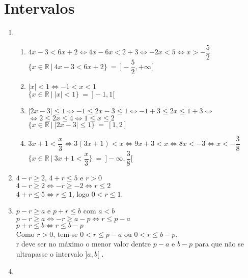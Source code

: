 \section{Intervalos}
\begin{enumerate}
\item %
	\begin{enumerate}
		\item %
		$4x - 3 < 6x + 2 \Leftrightarrow 4x -6x < 2+3 \Leftrightarrow -2x < 5 \Leftrightarrow x > -\dfrac{5}{2}$\\
		$\lbrace x \in \mathbb{R}\ |\ 4x-3<6x+2 \rbrace\ =\  ]-\dfrac{5}{2},+\infty [$
		\item %
		$\vert x \vert < 1 \Leftrightarrow -1 < x < 1$\\
		$\lbrace x \in \mathbb{R}\ |\ \vert x \vert < 1 \rbrace\ =\ ] -1, 1 [$
		\item %
		$\vert 2x - 3 \vert \leq 1 \Leftrightarrow -1 \leq 2x - 3 \leq 1 \Leftrightarrow -1+3 \leq 2x \leq 1 + 3 \Leftrightarrow$\\
		$\Leftrightarrow 2 \leq 2x \leq 4 \Leftrightarrow 1 \leq x \leq 2$\\
		$\lbrace x \in \mathbb{R}\ |\ \vert 2x -3 \vert \leq 1 \rbrace\ =\ [1,2]$
		\item %
		$3x+1<\dfrac{x}{3} \Leftrightarrow 3(3x+1)<x \Leftrightarrow 9x+3<x \Leftrightarrow  8x<-3\Leftrightarrow x<-\dfrac{3}{8}$\\
		$\lbrace x \in \mathbb{R}\ \vert\ 3x+1 < \dfrac{x}{3} \rbrace \ =\ ]-\infty,\dfrac{3}{8}[$
	\end{enumerate}
\item %
	$4-r \geq 2$, $4+r \leq 5$ e $r >0$\\
	$4 - r \geq 2 \Leftrightarrow -r \geq -2 \Leftrightarrow r \leq 2$\\
	$4+r \leq 5 \Leftrightarrow r \leq 1$, logo $0 < r \leq 1$.
\item %
	$p-r \geq a$ e $p+r \leq b$ com $a < b$\\
	$p-r \geq a \Leftrightarrow -r \geq a - p \Leftrightarrow r \leq p - a$\\
	$p+r \leq b \Leftrightarrow r \leq b - p$\\
	Como $r > 0$, tem-se $0 < r \leq p -a$ ou $0 < r \leq b-p$.\\
	r deve ser no máximo o menor valor dentre $p-a$ e $b-p$ para que não se ultrapasse o intervalo $]a,b[$	.
\item %

\end{enumerate}
